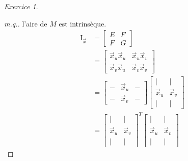 \documentclass{report}
\theoremstyle{definition}
\theoremstyle{remark}
\newtheorem*{exer}{Exercice}
\def\pff{\operatorname{I}}
\begin{document}
	\begin{exer}
		\begin{proof}[m.q.]
			l'aire de $M$ est intrins\`eque.
			\begin{align*}
				\pff_{\vec x}&= \begin{bmatrix}
					E&F\\F&G
				\end{bmatrix}\\
				&= \begin{bmatrix}
					\vec x_u\vec x_u&\vec x_u\vec x_v\\
					\vec x_v\vec x_u&\vec x_v\vec x_v
				\end{bmatrix}\\
				&= \begin{bmatrix}
					-&\vec x_u&-\\
					-&\vec x_v&-
				\end{bmatrix} \begin{bmatrix}
					|&|\\
					\vec x_u&\vec x_v\\
					|&|
				\end{bmatrix}\\
				&= \begin{bmatrix}
					|&|\\
					\vec x_u&\vec x_v\\
					|&|
				\end{bmatrix}^T \begin{bmatrix}
					|&|\\
					\vec x_u&\vec x_v\\
					|&|
				\end{bmatrix}
			\end{align*}


\end{proof}
\end{exer}
\end{document}
